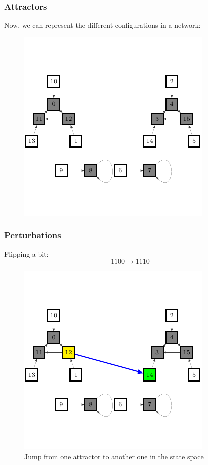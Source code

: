 \documentclass{beamer}
\begin{document}
\begin{frame}
\frametitle{Attractors}
Now, we can represent the different configurations in a network:
\begin{figure}
\centering
\includegraphics{fg3.pdf}
\end{figure}
\end{frame}



\begin{frame}
\frametitle{Perturbations}


Flipping a bit:
$$
1100 \to 1110
$$




\begin{figure}[h]
\centering
\includegraphics[scale=0.8]{fg4.pdf}
\caption{Jump from one attractor to another one in the state space}
\label{fig:rb4}
\end{figure}

\end{frame}
\end{document}
